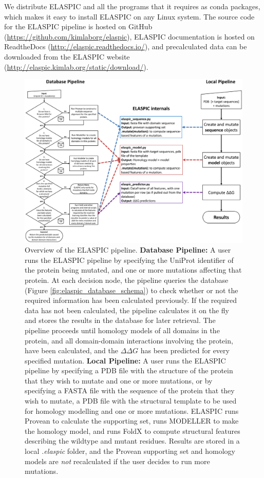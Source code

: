 We distribute ELASPIC and all the programs that it requires as conda packages, which makes it easy to install ELASPIC on any Linux system. The source code for the ELASPIC pipeline is hosted on GitHub (\url{https://github.com/kimlaborg/elaspic}), ELASPIC documentation is hosted on ReadtheDocs (\url{http://elaspic.readthedocs.io/}), and precalculated data can be downloaded from the ELASPIC website (\url{http://elaspic.kimlab.org/static/download/}).


\begin{figure}[!tb]
	\centering
	\includegraphics[width=1.0\textwidth]{static/elaspic/elaspic_flowchart.pdf}
	\caption[ELASPIC pipeline.]{Overview of the ELASPIC pipeline. \textbf{Database Pipeline:} A user runs the ELASPIC pipeline by specifying the UniProt identifier of the protein being mutated, and one or more mutations affecting that protein. At each decision node, the pipeline queries the database (Figure \ref{fig:elaspic_database_schema}) to check whether or not the required information has been calculated previously. If the required data has not been calculated, the pipeline calculates it on the fly and stores the results in the database for later retrieval. The pipeline proceeds until homology models of all domains in the protein, and all domain-domain interactions involving the protein, have been calculated, and the $\Delta \Delta G$ has been predicted for every specified mutation. \textbf{Local Pipeline:} A user runs the ELASPIC pipeline by specifying a PDB file with the structure of the protein that they wish to mutate and one or more mutations, or by specifying a FASTA file with the sequence of the protein that they wish to mutate, a PDB file with the structural template to be used for homology modelling and one or more mutations. ELASPIC runs Provean to calculate the supporting set, runs MODELLER to make the homology model, and runs FoldX to compute structural features describing the wildtype and mutant residues. Results are stored in a local \textit{.elaspic} folder, and the Provean supporting set and homology models are \textit{not} recalculated if the user decides to run more mutations.}
	\label{fig:elaspic_pipeline}
\end{figure}


